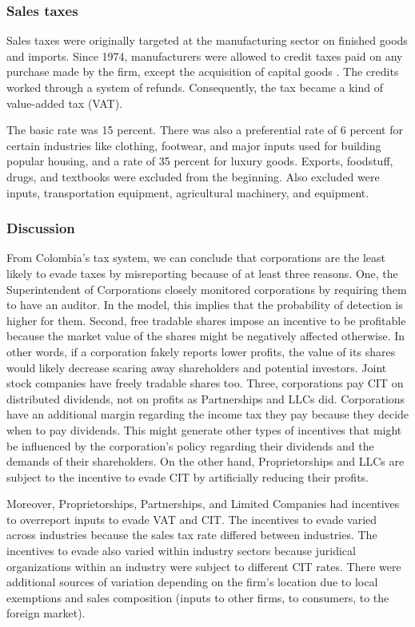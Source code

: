 \documentclass[
  12pt]{article}
\theoremstyle{definition}
\theoremstyle{remark}
\begin{document}
\subsubsection{Sales taxes}\label{sales-taxes}

Sales taxes were originally targeted at the manufacturing sector on
finished goods and imports. Since 1974, manufacturers were allowed to
credit taxes paid on any purchase made by the firm, except the
acquisition of capital goods \citep{Perry1990}. The credits worked
through a system of refunds. Consequently, the tax became a kind of
value-added tax (VAT).

The basic rate was 15 percent. There was also a preferential rate of 6
percent for certain industries like clothing, footwear, and major inputs
used for building popular housing, and a rate of 35 percent for luxury
goods. Exports, foodstuff, drugs, and textbooks were excluded from the
beginning. Also excluded were inputs, transportation equipment,
agricultural machinery, and equipment.

\subsubsection{Discussion}\label{discussion-1}

From Colombia's tax system, we can conclude that corporations are the
least likely to evade taxes by misreporting because of at least three
reasons. One, the Superintendent of Corporations closely monitored
corporations by requiring them to have an auditor. In the model, this
implies that the probability of detection is higher for them. Second,
free tradable shares impose an incentive to be profitable because the
market value of the shares might be negatively affected otherwise. In
other words, if a corporation fakely reports lower profits, the value of
its shares would likely decrease scaring away shareholders and potential
investors. Joint stock companies have freely tradable shares too. Three,
corporations pay CIT on distributed dividends, not on profits as
Partnerships and LLCs did. Corporations have an additional margin
regarding the income tax they pay because they decide when to pay
dividends. This might generate other types of incentives that might be
influenced by the corporation's policy regarding their dividends and the
demands of their shareholders. On the other hand, Proprietorships and
LLCs are subject to the incentive to evade CIT by artificially reducing
their profits.

Moreover, Proprietorships, Partnerships, and Limited Companies had
incentives to overreport inputs to evade VAT and CIT. The incentives to
evade varied across industries because the sales tax rate differed
between industries. The incentives to evade also varied within industry
sectors because juridical organizations within an industry were subject
to different CIT rates. There were additional sources of variation
depending on the firm's location due to local exemptions and sales
composition (inputs to other firms, to consumers, to the foreign
market).
\end{document}
